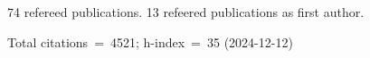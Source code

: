 74 refereed publications. 13 refeered publications as first author.

Total citations~=~4521; h-index~=~35 (2024-12-12)